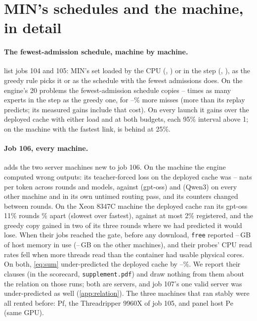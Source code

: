 \section{MIN's schedules and the machine, in detail}\label{app:more}
\paragraph{The fewest-admission schedule, machine by machine.}  list jobs 104 and 105: MIN's set
loaded by the CPU (\MinTwo, \FewTwo) or in the step (\MinOne, \FewOne), as the greedy rule picks it or as the schedule with the fewest admissions does. On the
engine's 20 problems the fewest-admission schedule copies \jfCopyRatioMin--\jfCopyRatioMax{} times as many experts in
the step as the greedy one, for \jfMissDevMin--\jfMissDevMax\% more misses (more than its replay predicts; its measured
gains include that cost). On every launch it gains over the deployed cache with either load and at both budgets, each
95\% interval above 1; on the machine with the fastest link, \FewTwo{} is \jhFastBypassMidBehind{} behind
\MinTwo{} at 25\%.





\paragraph{Job 106, every machine.}  adds the two server machines new to job 106. On the
\jiNllBadName{} machine the engine computed wrong outputs: its teacher-forced loss on the deployed cache was
\jiNllBadMin--\jiNllBadMax{} nats per token across rounds and models, against \jiNllGood{} (gpt-oss) and \jiNllGoodQ{}
(Qwen3) on every other machine and in its own untimed routing pass, and its counters changed between rounds. On the Xeon
8347C machine the deployed cache ran its gpt-oss 11\% rounds \jiUnstableSpreadMax\% apart (slowest over fastest), against at most 2\%
registered, and the greedy copy gained in two of its three rounds where we had predicted it would lose. When their jobs
reached the gate, before any download, \texttt{free} reported \jiUsedUnstMin--\jiUsedUnstMax\,GB of host memory in use
(\jiUsedStableMin--\jiUsedStableMax\,GB on the other machines), and their probes' CPU read rates fell when more threads
read than the container had usable physical cores. On both, \cref{eq:sum} under-predicted the deployed cache by
\jiUnstErrMin--\jiUnstErrMax\%. We report their clauses (in the scorecard, \texttt{supplement.pdf}) and draw nothing from them about the relation on those runs; both are servers, and job 107's one valid server was under-predicted as well (\cref{app:relation}). The three
machines that ran stably were all rented before: Pf, the Threadripper 9960X of job 105, and panel host Pe (same GPU).

